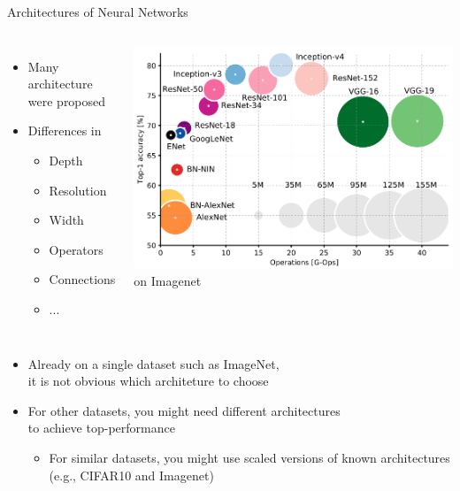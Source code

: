 \begin{frame}[c]{Architectures of Neural Networks}

\begin{columns}
	
	\begin{itemize}
		\item Many architecture were proposed
		\item Differences in 
		\begin{itemize}
			\item Depth
			\item Resolution
			\item Width
			\item Operators
			\item Connections
			\item ...
		\end{itemize}
	\end{itemize}
	
	
	\centering
	\includegraphics[width=1.0\textwidth]{images/overview_achitecture_perf.PNG}
	on Imagenet~
	
\end{columns}

\pause
\begin{itemize}
	\item Already on a single dataset such as ImageNet,\\ it is not obvious which architeture to choose
	\pause
	\item For other datasets, you might need different architectures\\ to achieve top-performance
	
	\pause
	\begin{itemize}
		\item For similar datasets, you might use scaled versions of known architectures (e.g., CIFAR10 and Imagenet)
	\end{itemize}
\end{itemize}

\end{frame}
